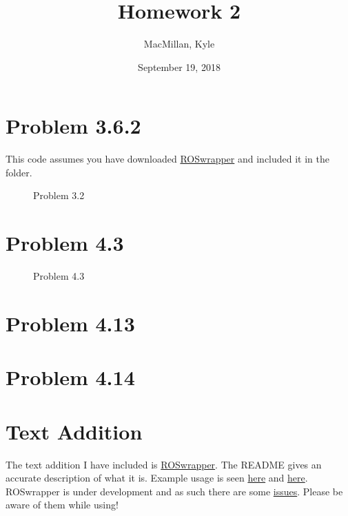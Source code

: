\documentclass{article}
\title{\textbf{Homework 2}}
\author{MacMillan, Kyle}
\date{September 19, 2018}
\begin{document}
\maketitle

\newpage
\tableofcontents
{}




\newpage
\hypersetup{
    colorlinks,
    citecolor=blue,
    filecolor=black,
    linkcolor=blue,
    urlcolor=blue
}

\setcounter{page}{1}
\section{\textbf{Problem 3.6.2}}
This code assumes you have downloaded \href{https://github.com/macattackftw/ROSwrapper}{ROSwrapper} and included it in the folder.


\newpage
\begin{figure}[htbp]
  \centering
  
  \caption{Problem 3.2}
\end{figure}


\newpage
\section{\textbf{Problem 4.3}}


\newpage
\begin{figure}[htbp]
  \centering
  
  \caption{Problem 4.3}
\end{figure}


\newpage
\section{\textbf{Problem 4.13}}



\newpage
\section{\textbf{Problem 4.14}}


\newpage
\section{\textbf{Text Addition}}
The text addition I have included is \href{https://github.com/macattackftw/ROSwrapper}{ROSwrapper}. The README gives an accurate description of what it is. Example usage is seen \href{https://github.com/macattackftw/ROSwrapper/blob/master/example_basenode.py}{here} and \href{https://github.com/macattackftw/ROSwrapper/blob/master/example_derivednode.py}{here}. ROSwrapper is under development and as such there are some \href{https://github.com/macattackftw/ROSwrapper/issues}{issues}. Please be aware of them while using!
\end{document}
